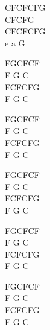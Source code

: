 \begin{chord}
    CFCFCFG\\
    CFCFG\\
    CFCFCFG\\
    e a G

    FGCFCF\\
    F G C\\
    FCFCFG\\
    F G C
    
    FGCFCF\\
    F G C\\
    FCFCFG\\
    F G C
    
    FGCFCF\\
    F G C\\
    FCFCFG\\
    F G C
    
    FGCFCF\\
    F G C\\
    FCFCFG\\
    F G C
    
    FGCFCF\\
    F G C\\
    FCFCFG\\
    F G C
\end{chord}
